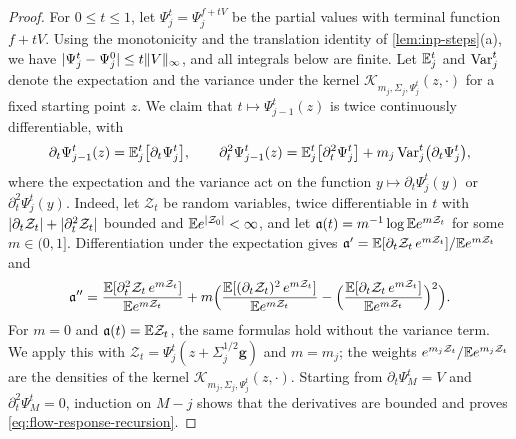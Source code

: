 \begin{proof}
For $0\le t\le1$, let $\Psi^t_j=\Psi^{f+tV}_j$ be the partial values with
terminal function $f+tV$. Using the monotonicity and the translation identity of
\cref{lem:inp-steps}(a), we have $\lvert \Psi_j^t-\Psi_j^0\rvert\le t\lVert V\rVert_\infty$, and
all integrals below are finite. Let $\mathbb E^t_j$ and $\operatorname{Var}_j^t$ denote the expectation and
the variance under the kernel $\mathcal K_{m_j,\Sigma_j,\Psi^t_j}(z,\cdot)$ for a
fixed starting point $z$. We claim that $t\mapsto\Psi^t_{j-1}(z)$ is twice
continuously differentiable, with
\begin{equation}\label{eq:flow-response-recursion}
 \partial_t\Psi^t_{j-1}(z)=\mathbb E^t_j\bigl[\partial_t\Psi^t_j\bigr],\qquad
 \partial_t^2\Psi^t_{j-1}(z)=\mathbb E^t_j\bigl[\partial_t^2\Psi^t_j\bigr]
 +m_j\operatorname{Var}^t_j\bigl(\partial_t\Psi^t_j\bigr),
\end{equation}
where the expectation and the variance act on the function $y\mapsto\partial_t\Psi^t_j(y)$
or $\partial^2_t\Psi^t_j(y)$. Indeed, let $\mathcal Z_t$ be random variables, twice
differentiable in $t$ with $\lvert \partial_t\mathcal Z_t\rvert+\lvert \partial^2_t\mathcal Z_t\rvert$ bounded and
$\mathbb E e^{\lvert \mathcal Z_0\rvert}<\infty$, and let $\mathfrak a(t)=m^{-1}\log\mathbb E e^{m\mathcal Z_t}$ for some
$m\in(0,1]$. Differentiation under the expectation gives
$\mathfrak a'=\mathbb E[\partial_t\mathcal Z_t\,e^{m\mathcal Z_t}]/\mathbb E e^{m\mathcal Z_t}$ and
\[
 \mathfrak a''=\frac{\mathbb E[\partial_t^2\mathcal Z_t\,e^{m\mathcal Z_t}]}{\mathbb E e^{m\mathcal Z_t}}
 +m\Bigl(\frac{\mathbb E[(\partial_t\mathcal Z_t)^2\,e^{m\mathcal Z_t}]}{\mathbb E e^{m\mathcal Z_t}}
 -\Bigl(\frac{\mathbb E[\partial_t\mathcal Z_t\,e^{m\mathcal Z_t}]}{\mathbb E e^{m\mathcal Z_t}}\Bigr)^2\Bigr).
\]
For $m=0$ and $\mathfrak a(t)=\mathbb E\mathcal Z_t$, the same formulas hold without the variance term. We
apply this with $\mathcal Z_t=\Psi^t_j(z+\Sigma_j^{1/2}\mathbf g)$ and $m=m_j$; the weights
$e^{m_j\mathcal Z_t}/\mathbb E e^{m_j\mathcal Z_t}$ are the densities of the kernel
$\mathcal K_{m_j,\Sigma_j,\Psi^t_j}(z,\cdot)$. Starting from $\partial_t\Psi^t_M=V$
and $\partial^2_t\Psi^t_M=0$, induction on $M-j$ shows that the derivatives are
bounded and proves \eqref{eq:flow-response-recursion}.


\end{proof}

